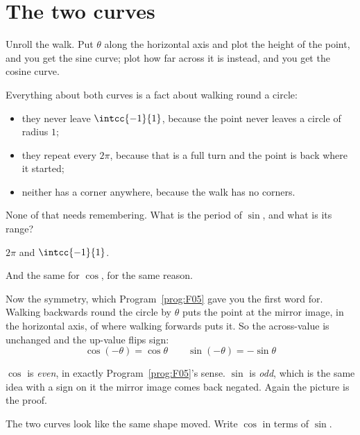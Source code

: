 
\section{The two curves}
\label{sec:F08-curves}

\begin{fr}
Unroll the walk. Put $\theta$ along the horizontal axis and plot the height of
the point, and you get the sine curve; plot how far across it is instead, and
you get the cosine curve.

Everything about both curves is a fact about walking round a circle:

\begin{itemize}
\item they never leave $\intcc{-1}{1}$, because the point never leaves a
  circle of radius $1$;
\item they repeat every $2\pi$, because that is a full turn and the point is
  back where it started;
\item neither has a corner anywhere, because the walk has no corners.
\end{itemize}

None of that needs remembering. What is the period of $\sin$, and what is its
range?
\nextframe
\end{fr}

\begin{fr}
\begin{ansblock}
$2\pi$ and $\intcc{-1}{1}$.
\end{ansblock}

And the same for $\cos$, for the same reason.

Now the symmetry, which Program~\ref{prog:F05} gave you the first word for.
Walking backwards round the circle by $\theta$ puts the point at the mirror
image, in
the horizontal axis, of where walking forwards puts it. So the across-value is
unchanged and the up-value flips sign:
\[ \cos(-\theta) = \cos\theta \qquad \sin(-\theta) = -\sin\theta \]

$\cos$ is \emph{even}, in exactly Program~\ref{prog:F05}'s sense. $\sin$ is
\emph{odd}, which is the same idea with a sign on it \dash{} the mirror image
comes back negated. Again the picture is the proof.

The two curves look like the same shape moved. Write $\cos$ in terms of $\sin$.
\nextframe
\end{fr}

